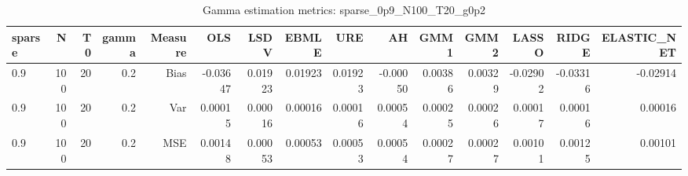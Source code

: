 \begin{table}[!htbp]\centering
\caption{Gamma estimation metrics: sparse_0p9_N100_T20_g0p2}
\label{tab:table1_sparse_0p9_N100_T20_g0p2}
\begin{tabular}{lrrrrrrrrrrrrrr}
\hline
sparse & N & T0 & gamma & Measure & OLS & LSDV & EBMLE & URE & AH & GMM1 & GMM2 & LASSO & RIDGE & ELASTIC_NET \\
\hline
0.9 & 100 & 20 & 0.2 & Bias & -0.03647 & 0.01923 & 0.01923 & 0.01923 & -0.00050 & 0.00386 & 0.00329 & -0.02902 & -0.03316 & -0.02914 \\
0.9 & 100 & 20 & 0.2 & Var & 0.00015 & 0.00016 & 0.00016 & 0.00016 & 0.00054 & 0.00025 & 0.00026 & 0.00017 & 0.00016 & 0.00016 \\
0.9 & 100 & 20 & 0.2 & MSE & 0.00148 & 0.00053 & 0.00053 & 0.00053 & 0.00054 & 0.00027 & 0.00027 & 0.00101 & 0.00125 & 0.00101 \\
\hline
\end{tabular}
\end{table}

